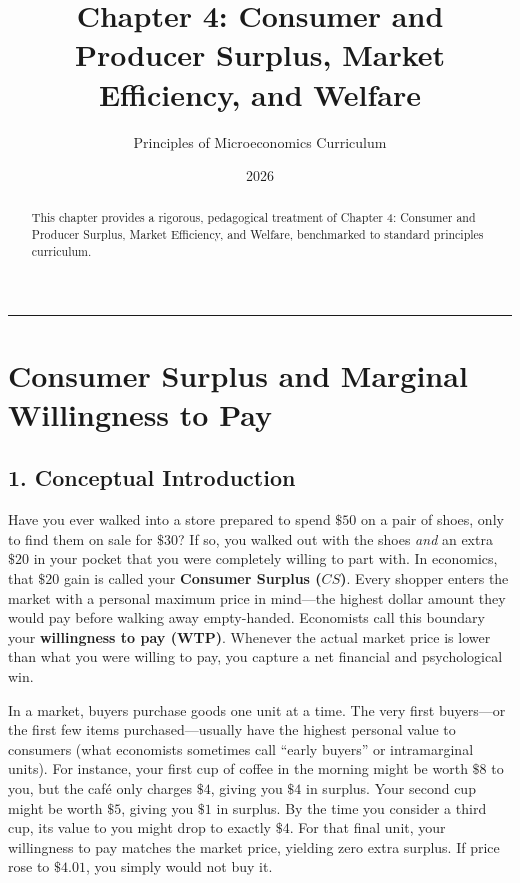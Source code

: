 \documentclass[11pt,letterpaper]{article}
\begin{document}
\title{\Huge\bfseries\color{SlateBlue} Chapter 4: Consumer and Producer Surplus, Market Efficiency, and Welfare}
\author{\large Principles of Microeconomics Curriculum}
\date{2026}
\maketitle

\thispagestyle{plain}

\begin{abstract}
This chapter provides a rigorous, pedagogical treatment of Chapter 4: Consumer and Producer Surplus, Market Efficiency, and Welfare, benchmarked to standard principles curriculum.
\end{abstract}

\tableofcontents
\vspace{1.5em}
\hrule
\vspace{1.5em}

\section{Consumer Surplus and Marginal Willingness to Pay}

\subsection*{1. Conceptual Introduction}
Have you ever walked into a store prepared to spend $\$50$ on a pair of shoes, only to find them on sale for $\$30$? If so, you walked out with the shoes \emph{and} an extra $\$20$ in your pocket that you were completely willing to part with. In economics, that $\$20$ gain is called your \textbf{Consumer Surplus ($CS$)}. Every shopper enters the market with a personal maximum price in mind—the highest dollar amount they would pay before walking away empty-handed. Economists call this boundary your \textbf{willingness to pay (WTP)}. Whenever the actual market price is lower than what you were willing to pay, you capture a net financial and psychological win.

In a market, buyers purchase goods one unit at a time. The very first buyers—or the first few items purchased—usually have the highest personal value to consumers (what economists sometimes call ``early buyers'' or intramarginal units). For instance, your first cup of coffee in the morning might be worth $\$8$ to you, but the café only charges $\$4$, giving you $\$4$ in surplus. Your second cup might be worth $\$5$, giving you $\$1$ in surplus. By the time you consider a third cup, its value to you might drop to exactly $\$4$. For that final unit, your willingness to pay matches the market price, yielding zero extra surplus. If price rose to $\$4.01$, you simply would not buy it.
\end{document}

